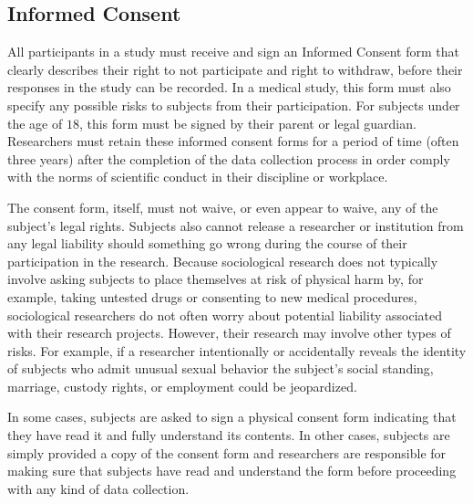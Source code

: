 \subsection{Informed Consent}

All participants in a study must receive and sign an Informed Consent form that clearly describes their right to not participate and right to withdraw, before their responses in the study can be recorded. In a medical study, this form must also specify any possible risks to subjects from their participation. For subjects under the age of $ 18 $, this form must be signed by their parent or legal guardian. Researchers must retain these informed consent forms for a period of time (often three years) after the completion of the data collection process in order comply with the norms of scientific conduct in their discipline or workplace.

The consent form, itself, must not waive, or even appear to waive, any of the subject's legal rights. Subjects also cannot release a researcher or institution from any legal liability should something go wrong during the course of their participation in the research. Because sociological research does not typically involve asking subjects to place themselves at risk of physical harm by, for example, taking untested drugs or consenting to new medical procedures, sociological researchers do not often worry about potential liability associated with their research projects. However, their research may involve other types of risks. For example, if a researcher intentionally or accidentally reveals the identity of subjects who admit unusual sexual behavior the subject's social standing, marriage, custody rights, or employment could be jeopardized.

In some cases, subjects are asked to sign a physical consent form indicating that they have read it and fully understand its contents. In other cases, subjects are simply provided a copy of the consent form and researchers are responsible for making sure that subjects have read and understand the form before proceeding with any kind of data collection. 

